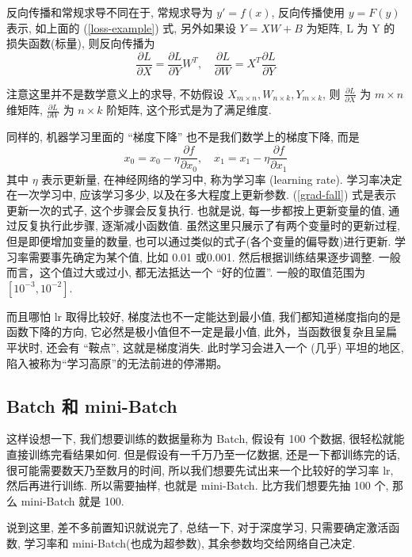 \documentclass[lang=cn,a4paper,newtx]{elegantpaper}
\begin{document}
反向传播和常规求导不同在于, 常规求导为 $ y' = f(x) $, 反向传播使用 $ y = F(y) $ 表示, 如上面的 (\ref{loss-example}) 式, 另外如果设 $ Y = XW + B $ 为矩阵, L 为 Y 的损失函数(标量), 则反向传播为
\begin{equation}
    \frac{\partial L}{\partial X} = \frac{\partial L}{\partial Y} W^T, \quad \frac{\partial L}{\partial W} = X^T \frac{\partial L}{\partial Y}
\end{equation}
\begin{remark}
    注意这里并不是数学意义上的求导, 不妨假设 $X_{m\times n}, W_{n \times k}, Y_{m\times k} $, 则 $ \frac{\partial L}{\partial X} $ 为 $ m \times n $ 维矩阵, $\frac{\partial L}{\partial W} $ 为  $ n \times k $ 阶矩阵, 这个形式是为了满足维度. 
\end{remark}
同样的, 机器学习里面的 ``梯度下降'' 也不是我们数学上的梯度下降, 而是
\begin{equation}
    x_0 = x_0 - \eta \frac{\partial f}{\partial x_0}, \quad x_1 = x_1 - \eta \frac{\partial f}{\partial x_1}
    \label{grad-fall}
\end{equation}
其中 $ \eta $ 表示更新量, 在神经网络的学习中, 称为学习率 (learning rate). 学习率决定在一次学习中, 应该学习多少, 以及在多大程度上更新参数. (\ref{grad-fall}) 式是表示更新一次的式子, 这个步骤会反复执行. 也就是说, 每一步都按上更新变量的值, 通过反复执行此步骤, 逐渐减小函数值. 虽然这里只展示了有两个变量时的更新过程, 但是即便增加变量的数量, 也可以通过类似的式子(各个变量的偏导数)进行更新. 学习率需要事先确定为某个值, 比如 0.01 或0.001. 然后根据训练结果逐步调整. 一般而言，这个值过大或过小, 都无法抵达一个 ``好的位置''. 一般的取值范围为 $ [10^{-3}, 10^{-2} ] $. 

而且哪怕 lr 取得比较好, 梯度法也不一定能达到最小值, 我们都知道梯度指向的是函数下降的方向, 它必然是极小值但不一定是最小值, 此外，当函数很复杂且呈扁平状时, 还会有 ``鞍点'', 这就是梯度消失. 此时学习会进入一个 (几乎) 平坦的地区, 陷入被称为“学习高原”的无法前进的停滞期。

\subsection{Batch 和 mini-Batch}
这样设想一下, 我们想要训练的数据量称为 Batch, 假设有 100 个数据, 很轻松就能直接训练完看结果如何. 但是假设有一千万乃至一亿数据, 还是一下都训练完的话, 很可能需要数天乃至数月的时间, 所以我们想要先试出来一个比较好的学习率 lr, 然后再进行训练. 所以需要抽样, 也就是 mini-Batch. 比方我们想要先抽 100 个, 那么 mini-Batch 就是 100. 

说到这里, 差不多前置知识就说完了, 总结一下, 对于深度学习, 只需要确定激活函数, 学习率和 mini-Batch(也成为超参数), 其余参数均交给网络自己决定. 
\end{document}
